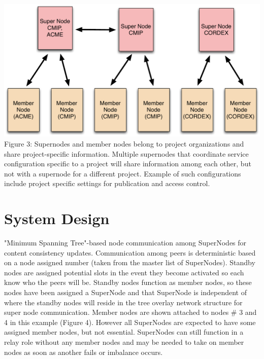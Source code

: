 \documentclass[oneside,12pt]{memoir}
\begin{document}
\begin{center}
\includegraphics[width=\textwidth]{presentation/ESG-node-org.pdf}
Figure 3: Supernodes and member nodes belong to project organizations and share project-specific information.   Multiple supernodes that coordinate service configuration specific to a project will share information among each other, but not with a supernode for a different project.  Example of such configurations include project specific settings for publication and access control.
\end{center}

\section{System Design}
\label{sysd}

"Minimum Spanning Tree"-based node communication among SuperNodes for content consistency updates.  Communication among peers is deterministic based on a node assigned number (taken from the master list of SuperNodes).     Standby nodes are assigned potential slots in the event they become activated so each know who the peers will be.  Standby nodes function as member nodes, so these nodes have been assigned a SuperNode and that SuperNode is independent of where the standby nodes will reside in the tree overlay network structure for super node communication.  Member nodes are shown attached to nodes \# 3 and 4 in this example (Figure 4).  However all SuperNodes are expected to have some assigned member nodes, but not essential.  SuperNodes can still function in a relay role without any member nodes and may be needed to take on member nodes as soon as another fails or imbalance occurs. 
\end{document}
